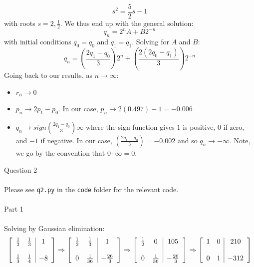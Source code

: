 \documentclass[10pt]{article} %
\begin{document}
\begin{equation}
	s^{2} = \frac{5}{2}s - 1
\end{equation}
with roots $s = 2, \frac{1}{2}$. We thus end up with the general solution: 
\begin{equation}
	q_{n} = 2^{n}A + B2^{-n}
\end{equation}
with initial conditions $q_0 = q_0$ and $q_1 = q_1$. Solving for $A$ and $B$:
\begin{equation}
	q_{n} = \left(\frac{2q_1 - q_0}{3} \right)2^{n} + \left( \frac{2\left( 2q_0 - q_1 \right)}{3} \right)2^{-n}
\end{equation}
Going back to our results, as $n \rightarrow \infty$:
\begin{itemize}
	\item $r_n \rightarrow 0$
	\item $p_n \rightarrow 2p_1 - p_0$. In our case, $p_n \rightarrow 2(0.497) - 1 = -0.006$
	\item $q_n \rightarrow sign\left(\frac{2q_1 - q_0}{3} \right) \infty$ where the sign function gives $1$ is positive, $0$ if zero, and $-1$ if negative. In our case, $\left(\frac{2q_1 - q_0}{3} \right) = -0.002$ and so $q_n \rightarrow -\infty$. Note, we go by  the convention that $0 \cdot \infty = 0$.
\end{itemize}
\newpage
\noindent \Large{Question 2}
\\ \\
\normalsize{Please see \texttt{q2.py} in the \texttt{code} folder for the relevant code.}
\\ \\
\noindent \large{Part 1}
\\ \\
\normalsize{Solving by Gaussian elimination:}
\[ 
\left[
\begin{array}{c c | c}
\frac{1}{2} & \frac{1}{3} & 1\\
& & \\
\frac{1}{3} & \frac{1}{4} & -8
\end{array}
\right]
\Rightarrow
\left[
\begin{array}{c c | c}
\frac{1}{2} & \frac{1}{3} & 1\\
& & \\
0 & \frac{1}{36} & -\frac{26}{3}
\end{array}
\right]
\Rightarrow
\left[
\begin{array}{c c | c}
\frac{1}{2} & 0 & 105\\
& & \\
0 & \frac{1}{36} & -\frac{26}{3}
\end{array}
\right]
\Rightarrow
\left[
\begin{array}{c c | c}
1 & 0 & 210\\
& & \\
0 & 1 & -312
\end{array}
\right]
\]
\end{document}
